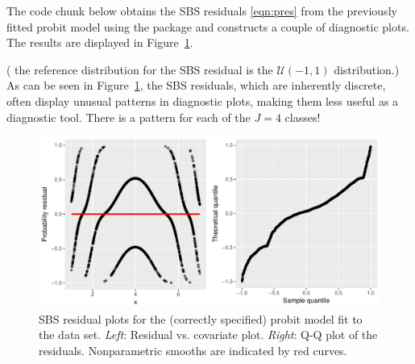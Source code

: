 The code chunk below obtains the SBS residuals \eqref{eqn:pres} from the previously fitted probit model  using the  package and constructs a couple of diagnostic plots. The results are displayed in Figure~\ref{fig:quadratic-correct-sbs}. 
( the reference distribution for the SBS residual is the $\left(-1, 1\right)$ distribution.) As can be seen in Figure~\ref{fig:quadratic-correct-sbs}, the SBS residuals, which are inherently discrete, often display unusual patterns in diagnostic plots, making them less useful as a diagnostic tool. There is a pattern for each of the $J = 4$ classes!
\begin{figure}[!htbp]
  \centering
  \includegraphics[width=1\textwidth]{quadratic-correct-sbs}
  \caption{SBS residual plots for the (correctly specified) probit model fit to the  data set. \textit{Left}: Residual vs. covariate plot. \textit{Right}: Q-Q plot of the residuals. Nonparametric smooths are indicated by red curves.}
  \label{fig:quadratic-correct-sbs}
\end{figure}


